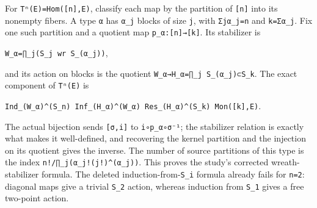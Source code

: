 \documentclass[
  10pt,
]{article}
\begin{document}
For
\texttt{\small Tⁿ(\allowbreak{}E)\allowbreak{}=\allowbreak{}Hom(\allowbreak{}[\allowbreak{}n]\allowbreak{},\allowbreak{}E)\allowbreak{}},
classify each map by the partition of
\texttt{\small [\allowbreak{}n]\allowbreak{}} into its nonempty fibers.
A type \texttt{\small α} has \texttt{\small α\_\allowbreak{}j} blocks of
size \texttt{\small j}, with
\texttt{\small Σjα\_\allowbreak{}j=\allowbreak{}n} and
\texttt{\small k=\allowbreak{}Σα\_\allowbreak{}j}. Fix one such
partition and a quotient map
\texttt{\small p\_\allowbreak{}α:\allowbreak{}[\allowbreak{}n]\allowbreak{}→\allowbreak{}[\allowbreak{}k]\allowbreak{}}.
Its stabilizer is

\texttt{\small W\_\allowbreak{}α=\allowbreak{}∏\_\allowbreak{}j(\allowbreak{}S\_\allowbreak{}j wr S\_\allowbreak{}(\allowbreak{}α\_\allowbreak{}j)\allowbreak{})\allowbreak{}},

and its action on blocks is the quotient
\texttt{\small W\_\allowbreak{}α→\allowbreak{}H\_\allowbreak{}α=\allowbreak{}∏\_\allowbreak{}j S\_\allowbreak{}(\allowbreak{}α\_\allowbreak{}j)\allowbreak{}⊂S\_\allowbreak{}k}.
The exact component of \texttt{\small Tⁿ(\allowbreak{}E)\allowbreak{}}
is

\texttt{\small Ind\_\allowbreak{}(\allowbreak{}W\_\allowbreak{}α)\allowbreak{}\textasciicircum{}(\allowbreak{}S\_\allowbreak{}n)\allowbreak{} Inf\_\allowbreak{}(\allowbreak{}H\_\allowbreak{}α)\allowbreak{}\textasciicircum{}(\allowbreak{}W\_\allowbreak{}α)\allowbreak{} Res\_\allowbreak{}(\allowbreak{}H\_\allowbreak{}α)\allowbreak{}\textasciicircum{}(\allowbreak{}S\_\allowbreak{}k)\allowbreak{} Mon(\allowbreak{}[\allowbreak{}k]\allowbreak{},\allowbreak{}E)\allowbreak{}}.

The actual bijection sends
\texttt{\small [\allowbreak{}σ,\allowbreak{}i]\allowbreak{}} to
\texttt{\small i∘p\_\allowbreak{}α∘σ⁻¹}; the stabilizer relation is
exactly what makes it well-defined, and recovering the kernel partition
and the injection on its quotient gives the inverse. The number of
source partitions of this type is the index
\texttt{\small n!/\allowbreak{}∏\_\allowbreak{}j(\allowbreak{}α\_\allowbreak{}j!(\allowbreak{}j!)\allowbreak{}\textasciicircum{}(\allowbreak{}α\_\allowbreak{}j)\allowbreak{})\allowbreak{}}.
This proves the study's corrected wreath-stabilizer formula. The deleted
induction-from-\texttt{\small S\_\allowbreak{}i} formula already fails
for \texttt{\small n=\allowbreak{}2}: diagonal maps give a trivial
\texttt{\small S\_\allowbreak{}2} action, whereas induction from
\texttt{\small S\_\allowbreak{}1} gives a free two-point action.
\end{document}
